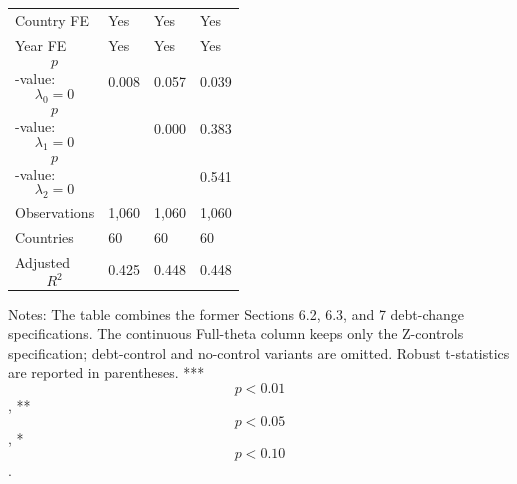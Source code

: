 \begin{table}[H]
\begin{threeparttable}
\begin{tabularx}{\textwidth}{lYYY}
Country FE & Yes & Yes & Yes \\
Year FE & Yes & Yes & Yes \\
$$p$$-value: $$\lambda_0=0$$ & 0.008 & 0.057 & 0.039 \\
$$p$$-value: $$\lambda_1=0$$ &  & 0.000 & 0.383 \\
$$p$$-value: $$\lambda_2=0$$ &  &  & 0.541 \\
Observations & 1,060 & 1,060 & 1,060 \\
Countries & 60 & 60 & 60 \\
Adjusted $$R^2$$ & 0.425 & 0.448 & 0.448 \\
\bottomrule
\end{tabularx}
\begin{tablenotes}[flushleft]\footnotesize
\item Notes: The table combines the former Sections 6.2, 6.3, and 7 debt-change specifications. The continuous Full-theta column keeps only the Z-controls specification; debt-control and no-control variants are omitted. Robust t-statistics are reported in parentheses. *** $$p<0.01$$, ** $$p<0.05$$, * $$p<0.10$$.
\end{tablenotes}
\end{threeparttable}
\end{table}
